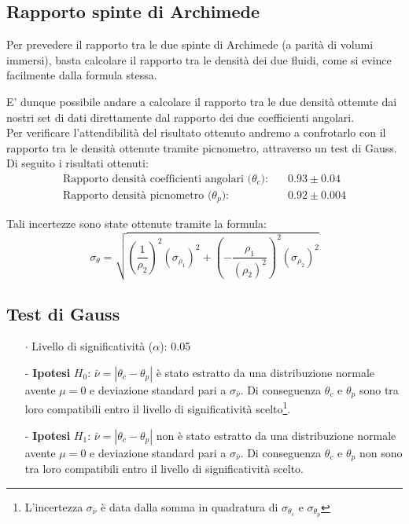 \documentclass{article}
\begin{document}
\subsection{Rapporto spinte di Archimede}
\indent Per prevedere il rapporto tra le due spinte di Archimede (a parità di volumi immersi), basta calcolare il rapporto tra le densità dei due fluidi, come si evince facilmente dalla formula stessa.

E' dunque possibile andare a calcolare il rapporto tra le due densità ottenute dai nostri set di dati direttamente dal rapporto dei due coefficienti angolari. 
\\Per verificare l'attendibilità del risultato ottenuto andremo a confrotarlo con il rapporto tra le densità ottenute tramite picnometro, attraverso un test di Gauss. Di seguito i risultati ottenuti: 
\begin{align*}
    \text{Rapporto densità coefficienti angolari ($\theta_c$):}\quad&0.93 \pm 0.04  \\
    \text{Rapporto densità picnometro ($\theta_p$):}\quad&0.92 \pm 0.004
\end{align*}

\noindent Tali incertezze sono state ottenute tramite la formula: 
\begin{equation}
    \sigma_{\theta} = \sqrt{\left(\frac{1}{\rho_2}\right)^2 \left(\sigma_{\rho_1}\right)^2 + \left(-\frac{\rho_1}{(\rho_{2})^2}\right)^2  \left(\sigma_{\rho_2}\right)^2}
\end{equation}


\subsection*{Test di Gauss}
\begin{itemize}
    \item [$\cdot$] Livello di significatività ($\alpha$): 0.05
    \item [-] \textbf{Ipotesi} $H_0$: $\bar{\nu} = |\theta_c - \theta_p|$ è stato estratto da una distribuzione normale avente $\mu = 0$ e deviazione standard pari a $\sigma_{\bar{\nu}}$. Di conseguenza $\theta_c$ e $\theta_p$ sono tra loro compatibili entro il livello di significatività scelto\footnote{L'incertezza $\sigma_{\bar{\nu}}$ è data dalla somma in quadratura di $\sigma_{\theta_c}$ e $\sigma_{\theta_p}$}.
    \item [-] \textbf{Ipotesi} $H_1$: $\bar{\nu} = |\theta_c - \theta_p|$ non è stato estratto da una distribuzione normale avente $\mu = 0$ e deviazione standard pari a $\sigma_{\bar{\nu}}$. Di conseguenza $\theta_c$ e $\theta_p$ non sono tra loro compatibili entro il livello di significatività scelto.
\end{itemize}
\end{document}
